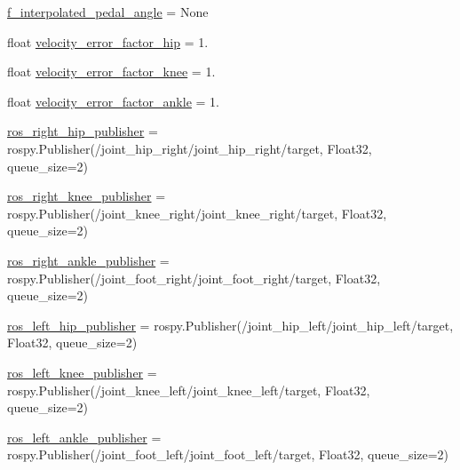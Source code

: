 \begin{DoxyCompactItemize}
\item 
\mbox{\hyperlink{namespacejoint__angle__velocity__factor__test_addc77190c926cfbe1cfe5a50f9f3677b}{f\+\_\+interpolated\+\_\+pedal\+\_\+angle}} = None
\item 
float \mbox{\hyperlink{namespacejoint__angle__velocity__factor__test_a5c04fca0b51145c6e8187f42ffb6698e}{velocity\+\_\+error\+\_\+factor\+\_\+hip}} = 1.
\item 
float \mbox{\hyperlink{namespacejoint__angle__velocity__factor__test_a16da1de65c5f4a005d132d2d06fbd1b8}{velocity\+\_\+error\+\_\+factor\+\_\+knee}} = 1.
\item 
float \mbox{\hyperlink{namespacejoint__angle__velocity__factor__test_a4669f2597ce5e1bbc320ca604b837a5f}{velocity\+\_\+error\+\_\+factor\+\_\+ankle}} = 1.
\item 
\mbox{\hyperlink{namespacejoint__angle__velocity__factor__test_a068d7755b51f5e0f498dd03cd74af1ec}{ros\+\_\+right\+\_\+hip\+\_\+publisher}} = rospy.\+Publisher(\textquotesingle{}/joint\+\_\+hip\+\_\+right/joint\+\_\+hip\+\_\+right/target\textquotesingle{}, Float32, queue\+\_\+size=2)
\item 
\mbox{\hyperlink{namespacejoint__angle__velocity__factor__test_ab0d6cd1fb94c0f64a1f49e2a45b0e42b}{ros\+\_\+right\+\_\+knee\+\_\+publisher}} = rospy.\+Publisher(\textquotesingle{}/joint\+\_\+knee\+\_\+right/joint\+\_\+knee\+\_\+right/target\textquotesingle{}, Float32, queue\+\_\+size=2)
\item 
\mbox{\hyperlink{namespacejoint__angle__velocity__factor__test_a9aa60022fc817fdfb6486f76c278c3fd}{ros\+\_\+right\+\_\+ankle\+\_\+publisher}} = rospy.\+Publisher(\textquotesingle{}/joint\+\_\+foot\+\_\+right/joint\+\_\+foot\+\_\+right/target\textquotesingle{}, Float32, queue\+\_\+size=2)
\item 
\mbox{\hyperlink{namespacejoint__angle__velocity__factor__test_a4b548d6a82b938905ae0fc7c3472731f}{ros\+\_\+left\+\_\+hip\+\_\+publisher}} = rospy.\+Publisher(\textquotesingle{}/joint\+\_\+hip\+\_\+left/joint\+\_\+hip\+\_\+left/target\textquotesingle{}, Float32, queue\+\_\+size=2)
\item 
\mbox{\hyperlink{namespacejoint__angle__velocity__factor__test_a16ed2bbdceab6a36b04a4a4817f2a38e}{ros\+\_\+left\+\_\+knee\+\_\+publisher}} = rospy.\+Publisher(\textquotesingle{}/joint\+\_\+knee\+\_\+left/joint\+\_\+knee\+\_\+left/target\textquotesingle{}, Float32, queue\+\_\+size=2)
\item 
\mbox{\hyperlink{namespacejoint__angle__velocity__factor__test_a647b8013a52b1c161b4aa817208f8d90}{ros\+\_\+left\+\_\+ankle\+\_\+publisher}} = rospy.\+Publisher(\textquotesingle{}/joint\+\_\+foot\+\_\+left/joint\+\_\+foot\+\_\+left/target\textquotesingle{}, Float32, queue\+\_\+size=2)

\end{DoxyCompactItemize}
